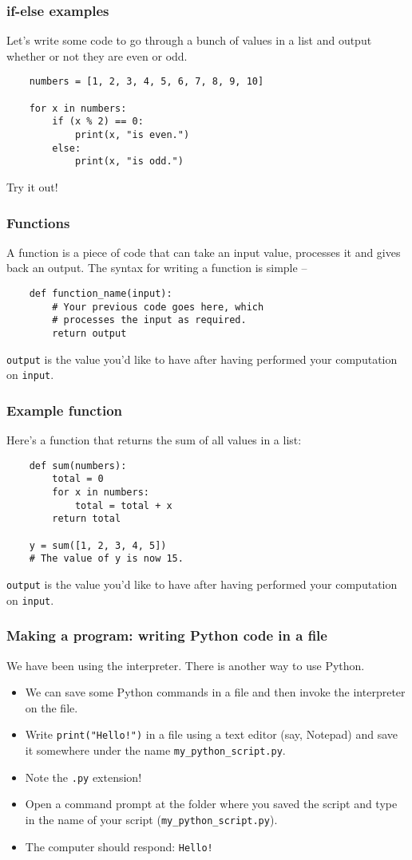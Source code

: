 \documentclass[notes]{beamer}
\begin{document}
\begin{frame}[fragile]
    \frametitle{if-else examples}

    Let's write some code to go through a bunch of values in a list and output whether or not they are even or odd.
    
    \pause
    \begin{lstlisting}
    numbers = [1, 2, 3, 4, 5, 6, 7, 8, 9, 10]

    for x in numbers:
        if (x % 2) == 0:
            print(x, "is even.")
        else:
            print(x, "is odd.")
    \end{lstlisting}
    \pause
    Try it out!
\end{frame}

\begin{frame}[fragile]
    \frametitle{Functions}
    A function is a piece of code that can take an input value, processes it and gives back an output. The syntax for writing a function is simple --
    \begin{lstlisting}
    def function_name(input):
        # Your previous code goes here, which
        # processes the input as required.
        return output
    \end{lstlisting}
    {\tt output} is the value you'd like to have after having performed your computation on {\tt input}.
\end{frame}

\begin{frame}[fragile]
    \frametitle{Example function}
    Here's a function that returns the sum of all values in a list:
    \begin{lstlisting}
    def sum(numbers):
        total = 0
        for x in numbers:
            total = total + x
        return total

    y = sum([1, 2, 3, 4, 5])
    # The value of y is now 15.
    \end{lstlisting}
    {\tt output} is the value you'd like to have after having performed your computation on {\tt input}.
\end{frame}

\begin{frame}[fragile]
    \frametitle{Making a program: writing Python code in a file}
    We have been using the interpreter. There is another way to use Python.
    \begin{itemize}
        \item We can save some Python commands in a file and then invoke the interpreter on the file.
        \pause
        \item Write \lstinline|print("Hello!")| in a file using a text editor (say, Notepad) and save it somewhere under the name \lstinline|my_python_script.py|.
        \item Note the \lstinline|.py| extension!
        \pause
        \item Open a command prompt at the folder where you saved the script and type in the name of your script (\lstinline|my_python_script.py|).
        \item The computer should respond: \lstinline|Hello!|
    \end{itemize}
    
\end{frame}
\end{document}
